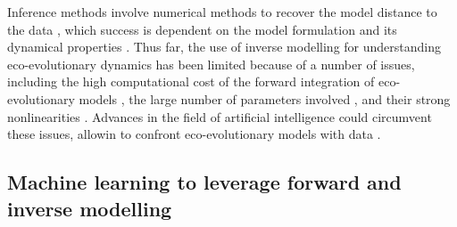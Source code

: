 % 
Inference methods involve numerical methods to recover the model distance to the data \xxx, which success is dependent on the model formulation and its dynamical properties \xxx.
% 
% 
% 
Thus far, the use of inverse modelling for understanding eco-evolutionary dynamics has been limited because of a number of issues, including the high computational cost of the forward integration of eco-evolutionary models \citep{Fisher2018}, the large number of parameters involved \citep{Boyd2012}, and their strong nonlinearities \citep{Hastings1993,Huisman1999,Beninca2008}. Advances in the field of artificial intelligence could circumvent these issues, allowin to confront eco-evolutionary models with data \xxx.

\subsection{Machine learning to leverage forward and inverse modelling}


